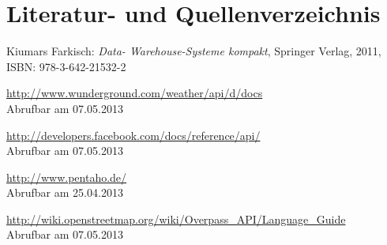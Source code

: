 \documentclass[a4paper,12pt]{scrartcl}
\begin{document}

\clearpage
\section{Literatur- und Quellenverzeichnis}

\renewcommand\refname{Literaturverzeichnis}
\begin{thebibliography}{999}

Kiumars Farkisch:  {\sl Data- Warehouse-Systeme kompakt}, Springer Verlag, 2011,
\\ISBN:  978-3-642-21532-2

\end{thebibliography}

\renewcommand\refname{Quellenverzeichnis}
\begin{thebibliography}{999}

\url{http://www.wunderground.com/weather/api/d/docs}
\\Abrufbar am 07.05.2013


\url{http://developers.facebook.com/docs/reference/api/}
\\Abrufbar am 07.05.2013


\url{http://www.pentaho.de/}
\\Abrufbar am 25.04.2013


\url{http://wiki.openstreetmap.org/wiki/Overpass_API/Language_Guide}
\\Abrufbar am 07.05.2013


\end{thebibliography}

\clearpage



\end{document}

